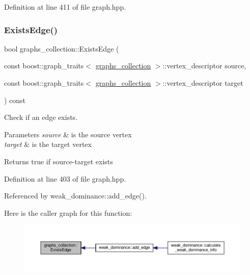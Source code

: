 Definition at line 411 of file graph.\+hpp.

\mbox{\label{structgraphs__collection_abd66e72ce6935149b74c2a4572e9b337}} 
\subsubsection{\texorpdfstring{Exists\+Edge()}{ExistsEdge()}}
{\footnotesize\ttfamily bool graphs\+\_\+collection\+::\+Exists\+Edge (\begin{DoxyParamCaption}\item[{const boost\+::graph\+\_\+traits$<$ \hyperlink{structgraphs__collection}{graphs\+\_\+collection} $>$\+::vertex\+\_\+descriptor}]{source,  }\item[{const boost\+::graph\+\_\+traits$<$ \hyperlink{structgraphs__collection}{graphs\+\_\+collection} $>$\+::vertex\+\_\+descriptor}]{target }\end{DoxyParamCaption}) const\hspace{0.3cm}{\ttfamily [inline]}}



Check if an edge exists. 


\begin{DoxyParams}{Parameters}
{\em source} & is the source vertex \\
\hline
{\em target} & is the target vertex \\
\hline
\end{DoxyParams}
\begin{DoxyReturn}{Returns}
true if source-\/target exists 
\end{DoxyReturn}


Definition at line 403 of file graph.\+hpp.



Referenced by weak\+\_\+dominance\+::add\+\_\+edge().

Here is the caller graph for this function\+:
\nopagebreak
\begin{figure}[H]
\begin{center}
\leavevmode
\includegraphics[width=350pt]{d8/d8d/structgraphs__collection_abd66e72ce6935149b74c2a4572e9b337_icgraph}
\end{center}
\end{figure}
\mbox{\label{structgraphs__collection_a99d8a722a7c4690f13a3a026f452c6c6}} 
